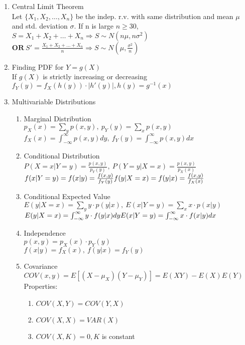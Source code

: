 \documentclass[10pt]{article}
\begin{document}
\begin{multicols}{2}
\begin{enumerate}
			\item Central Limit Theorem\\
			Let $\{ X_1, X_2, \dots, X_n \}$ be the indep. r.v. with same distribution and mean $\mu$ and std. deviation $\sigma$. If n is large $n \ge 30$, 
			$ S = X_1 + X_2 + \dots + X_n \Rightarrow S\sim N(n\mu, n\sigma^2)$\\
			$\textbf{OR} \ S' = \frac{X_1 + X_2 + \dots + X_n}{n} \Rightarrow S\sim N(\mu, \frac{\sigma^2}{n})$
			\item Finding PDF for $Y = g(X)$\\
			If $g(X)$ is strictly increasing or decreasing\\
			$f_Y(y) = f_X(h(y)) \cdot |h'(y)|, h(y) = g^{-1}(x)$
			\item Multivariable Distributions
			\begin{enumerate}
				\item Marginal Distribution\\
				$p_X(x)=\sum_{y}p(x,y), \ p_Y(y)=\sum_{x}p(x,y) $\\
				$f_X(x) = \int_{-\infty}^{\infty}p(x,y)dy, \ f_Y(y) = \int_{-\infty}^{\infty}p(x,y)dx$
				\item Conditional Distribution\\
				$P(X = x|Y = y) = \frac{p(x,y)}{p_Y(y)}, \ P(Y = y|X = x) = \frac{p(x,y)}{p_X(x)}$\\
				$f(x|Y=y)=f(x|y) =\frac{f(x,y)}{f_Y(y)}
				\\ f(y|X=x)=f(y|x)=\frac{f(x,y)}{f_X(x)}$
				\item Conditional Expected Value\\
				$E(y|X=x) = \sum_{y}y\cdot p(y|x), \ E(x|Y=y) = \sum_{x}x\cdot p(x|y)$\\
				$E(y|X=x) = \int_{-\infty}^{\infty}y\cdot f(y|x)dy \\
				E(x|Y=y) = \int_{-\infty}^{\infty}x\cdot f(x|y)dx$
				\item Independence\\
				$p(x,y) = p_X(x) \cdot p_Y(y)$\\
				$f(x|y) = f_X(x), \ f(y|x) = f_Y(y)$
				\item Covariance\\
				$COV(x,y) = E[(X-\mu_X)(Y-\mu_Y)] = E(XY) - E(X)E(Y)$\\
				Properties:
				\begin{enumerate}
					\item $COV(X,Y) = COV(Y,X)$
					\item $COV(X,X) = VAR(X)$
					\item $COV(X,K) = 0, K$ is constant

\end{enumerate}
\end{enumerate}
\end{enumerate}
\end{multicols}
\end{document}
